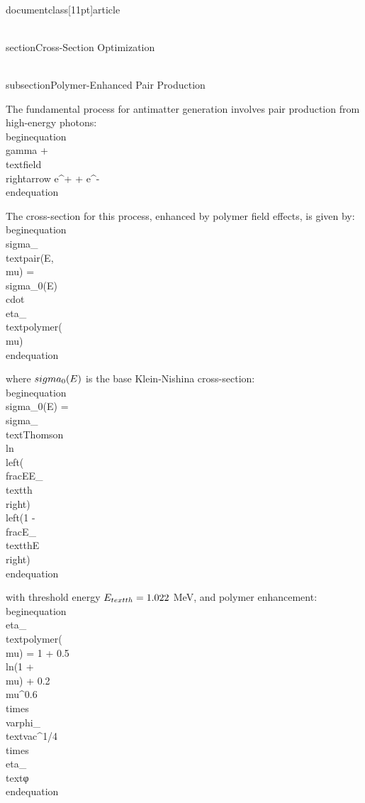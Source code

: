\\documentclass[11pt]{article}
\begin{document}
\\section{Cross-Section Optimization}

\\subsection{Polymer-Enhanced Pair Production}

The fundamental process for antimatter generation involves pair production from high-energy photons:
\\begin{equation}
\\gamma + \\text{field} \\rightarrow e^+ + e^-
\\end{equation}

The cross-section for this process, enhanced by polymer field effects, is given by:
\\begin{equation}
\\sigma_{\\text{pair}}(E, \\mu) = \\sigma_0(E) \\cdot \\eta_{\\text{polymer}}(\\mu)
\\end{equation}

where $\\sigma_0(E)$ is the base Klein-Nishina cross-section:
\\begin{equation}
\\sigma_0(E) = \\sigma_{\\text{Thomson}} \\ln\\left(\\frac{E}{E_{\\text{th}}}\\right) \\left(1 - \\frac{E_{\\text{th}}}{E}\\right)
\\end{equation}

with threshold energy $E_{\\text{th}} = 1.022$ MeV, and polymer enhancement:
\\begin{equation}
\\eta_{\\text{polymer}}(\\mu) = 1 + 0.5 \\ln(1 + \\mu) + 0.2 \\mu^{0.6} \\times \\varphi_{\\text{vac}}^{1/4} \\times \\eta_{\\text{φ}} %
\\end{equation}
\end{document}
